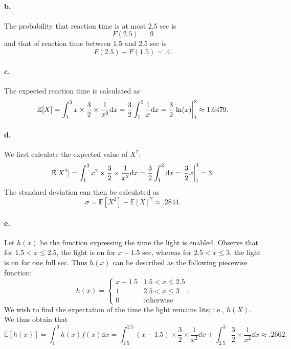 \documentclass{exam}
\begin{document}
\paragraph{b.} The probability that reaction time is at most 2.5 sec is
\[
	F(2.5) = .9
\]
and that of reaction time between 1.5 and 2.5 sec is
\[
	F(2.5) - F(1.5) = .4.
\]

\paragraph{c.} The expected reaction time is calculated as
\[
	\mathbb E[X] = \int_1^3 x \times \frac32 \times \frac1{x^2}\dd x = \frac32 \int_1^3 \frac1x \dd x = \frac32 \eval{\ln(x)}_1^3 \approx 1.6479.
\]

\paragraph{d.} We first calculate the expected value of $X^2$:
\[
	\mathbb E[X^2] = \int_1^3 x^2 \times \frac32 \times \frac1{x^2}\dd x = \frac32 \int_1^3 \dd x = \eval{\frac32x}_1^3 = 3.
\]
The standard deviation can then be calculated as
\[
	\sigma = \mathbb E[X^2] - \mathbb E[X]^2 \approx .2844.
\]

\paragraph{e.} Let $h(x)$ be the function expressing the time the light is enabled. Observe that for $1.5 < x \le 2.5$, the light is on for $x - 1.5$ sec, whereas for $2.5 < x \le 3$, the light is on for one full sec. Thus $h(x)$ can be described as the following piecewise function:
\[
	h(x) = \begin{cases}
		x - 1.5 & 1.5 < x \le 2.5 \\
		1 & 2.5 < x \le 3 \\
		0 & \text{otherwise}
	\end{cases}.
\]
We wish to find the expectation of the time the light remains lits; i.e., $h(X)$. We thus obtain that
\[
	\mathbb E[h(x)] = \int_1^3 h(x)f(x)\dd x = \int_{1.5}^{2.5} (x - 1.5) \times \frac32 \times \frac1{x^2} \dd x + \int_{2.5}^3 \frac32 \times \frac1{x^2} \dd x \approx .2662.
\]
\end{document}
